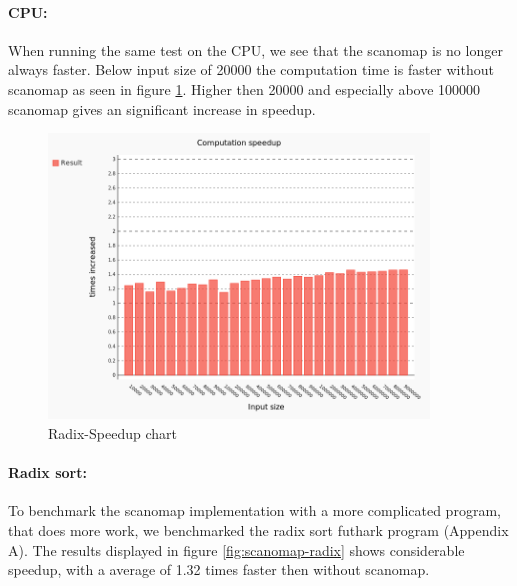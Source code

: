 \documentclass[11pt]{article}
\begin{document}
\paragraph*{CPU:} When running the same test on the CPU, we see that the scanomap is no longer always faster. Below input size of 20000 the computation time is faster without scanomap as seen in figure \ref{fig:CPU-map-scan fusion speedup}. Higher then 20000 and especially above 100000 scanomap gives an significant increase in speedup.

\begin{figure}[hb]
  \centering
    \includegraphics[width=0.9\textwidth]{images/radix-comparing.png}
  \caption{Radix-Speedup chart}
  \label{fig:CPU-map-scan fusion speedup}
\end{figure}

\paragraph*{Radix sort:}

To benchmark the scanomap implementation with a more complicated program, that does more work, we benchmarked the radix sort futhark program (Appendix A). The results displayed in figure \ref{fig:scanomap-radix} shows considerable speedup, with a average of 1.32 times faster then without scanomap.
\end{document}
